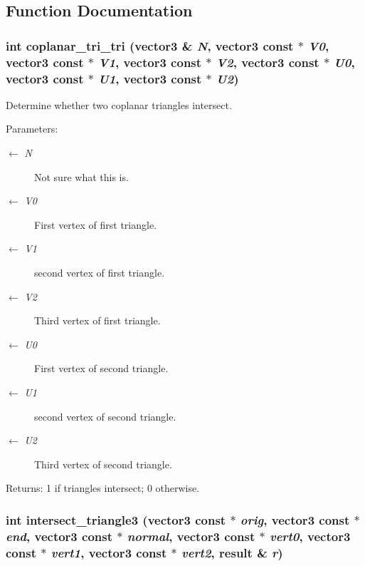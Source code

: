 \subsection{Function Documentation}
\subsubsection{\setlength{\rightskip}{0pt plus 5cm}int coplanar\_\-tri\_\-tri ({\bf vector3} \& {\em N}, {\bf vector3} const $\ast$ {\em V0}, {\bf vector3} const $\ast$ {\em V1}, {\bf vector3} const $\ast$ {\em V2}, {\bf vector3} const $\ast$ {\em U0}, {\bf vector3} const $\ast$ {\em U1}, {\bf vector3} const $\ast$ {\em U2})}\label{opttritri_8h_7cc10013bc791c2bfab4bb52a1a2809e}


Determine whether two coplanar triangles intersect. \begin{Desc}
\item[Parameters:]
\begin{description}
\item[\mbox{$\leftarrow$} {\em N}]Not sure what this is. \item[\mbox{$\leftarrow$} {\em V0}]First vertex of first triangle. \item[\mbox{$\leftarrow$} {\em V1}]second vertex of first triangle. \item[\mbox{$\leftarrow$} {\em V2}]Third vertex of first triangle. \item[\mbox{$\leftarrow$} {\em U0}]First vertex of second triangle. \item[\mbox{$\leftarrow$} {\em U1}]second vertex of second triangle. \item[\mbox{$\leftarrow$} {\em U2}]Third vertex of second triangle. \end{description}
\end{Desc}
\begin{Desc}
\item[Returns:]1 if triangles intersect; 0 otherwise. \end{Desc}
\subsubsection{\setlength{\rightskip}{0pt plus 5cm}int intersect\_\-triangle3 ({\bf vector3} const $\ast$ {\em orig}, {\bf vector3} const $\ast$ {\em end}, {\bf vector3} const $\ast$ {\em normal}, {\bf vector3} const $\ast$ {\em vert0}, {\bf vector3} const $\ast$ {\em vert1}, {\bf vector3} const $\ast$ {\em vert2}, {\bf result} \& {\em r})}\label{opttritri_8h_d7a9482aa12886f663ad07d306fe8ccb}


